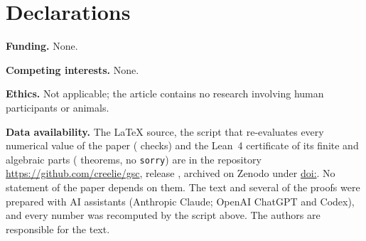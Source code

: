 \section*{Declarations}

\noindent\textbf{Funding.} None.

\noindent\textbf{Competing interests.} None.

\noindent\textbf{Ethics.} Not applicable; the article contains no research
involving human participants or animals.

\noindent\textbf{Data availability.} The \LaTeX{} source, the script that
re-evaluates every numerical value of the paper (\checkscount{} checks) and the
Lean~4 certificate of its finite and algebraic parts (\leancount{} theorems,
no \texttt{sorry}) are in the repository
\url{https://github.com/creelie/gsc}, release \releaseTag, archived on Zenodo
under \href{https://doi.org/\zenodoCodeID}{doi:\zenodoCodeID}. No statement of the
paper depends on them. The text and several of the proofs were prepared with AI assistants
(Anthropic Claude; OpenAI ChatGPT and Codex), and every number was
recomputed by the script above. The authors are responsible for the text.
